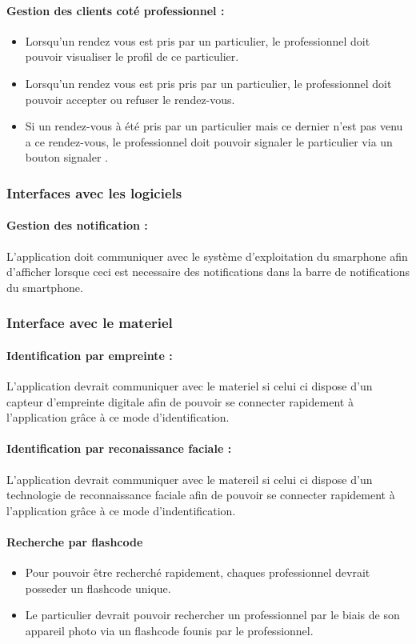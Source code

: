 \documentclass{article}
\begin{document}
\paragraph{Gestion des clients coté professionnel :}
\begin{itemize}
\item Lorsqu'un rendez vous est pris par un particulier, le
  professionnel doit pouvoir visualiser le profil de ce particulier.
 \item Lorsqu'un rendez vous est pris pris par un particulier, le
  professionnel doit pouvoir accepter ou refuser le rendez-vous.
\item Si un rendez-vous à été pris par un particulier mais ce dernier
  n'est pas venu a ce rendez-vous, le professionnel doit pouvoir
  signaler le particulier via un bouton \og signaler \fg{}.
\end{itemize}

\subsubsection{Interfaces avec les logiciels}
\paragraph{Gestion des notification :}
L'application doit communiquer avec le système d'exploitation du
smarphone afin d'afficher lorsque ceci est necessaire des
notifications dans la barre de notifications du smartphone.

\subsubsection{Interface avec le materiel}
\paragraph{Identification par empreinte :}
L'application devrait communiquer avec le materiel si celui ci dispose
d'un capteur d'empreinte digitale afin de pouvoir se connecter rapidement à
l'application grâce à ce mode d'identification.
\paragraph{Identification par reconaissance faciale :}
L'application devrait communiquer avec le matereil si celui ci dispose
d'un technologie de reconnaissance faciale afin de pouvoir se
connecter rapidement à l'application grâce à ce mode
d'indentification.
\paragraph{Recherche par flashcode}
\begin{itemize}
\item Pour pouvoir être recherché rapidement, chaques professionnel
  devrait posseder un flashcode unique.
\item Le particulier devrait pouvoir rechercher un professionnel par le
  biais de son appareil photo via un flashcode founis par le
  professionnel.
\end{itemize}
\end{document}
